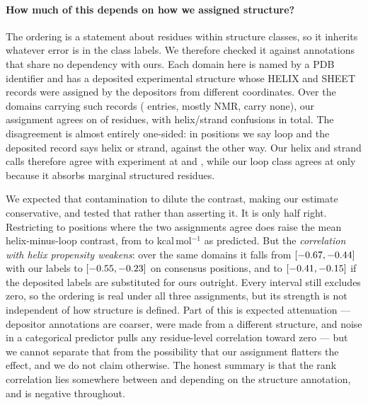 \documentclass[11pt]{article}
\begin{document}
\paragraph{How much of this depends on how we assigned structure?} The ordering is a statement
about residues within structure classes, so it inherits whatever error is in the class labels. We
therefore checked it against annotations that share no dependency with ours. Each domain here is
named by a PDB identifier and has a deposited experimental structure whose HELIX and SHEET records
were assigned by the depositors from different coordinates. Over the \PdbNdom{} domains carrying
such records (\PdbNoRecords{} entries, mostly NMR, carry none), our assignment agrees on
\PdbAgree{} of \PdbNres{} residues, with \PdbHEconf{} helix/strand confusions in total. The
disagreement is almost entirely one-sided: in \PdbWeLoopTheyStruct{} positions we say loop and the
deposited record says helix or strand, against \PdbWeStructTheyLoop{} the other way. Our helix and
strand calls therefore agree with experiment at \PdbRecallH{} and \PdbRecallE{}, while our loop
class agrees at only \PdbRecallL{} because it absorbs marginal structured residues.

We expected that contamination to dilute the contrast, making our estimate conservative, and tested
that rather than asserting it. It is only half right. Restricting to positions where the two
assignments agree does raise the mean helix-minus-loop contrast, from \SensContrastBase{} to
\SensContrastCons{} kcal\,mol$^{-1}$ as predicted. But the \emph{correlation with helix propensity
weakens}: over the same \SensNdom{} domains it falls from \SensBase{}
$[-0.67{}, -0.44{}]$ with our labels to \SensCons{} $[-0.55{}, -0.23{}]$ on
consensus positions, and to \SensDep{} $[-0.41{}, -0.15{}]$ if the deposited labels are
substituted for ours outright. Every interval still excludes zero, so the ordering is real under
all three assignments, but its strength is not independent of how structure is defined. Part of
this is expected attenuation --- depositor annotations are coarser, were made from a different
structure, and noise in a categorical predictor pulls any residue-level correlation toward zero ---
but we cannot separate that from the possibility that our assignment flatters the effect, and we
do not claim otherwise. The honest summary is that the rank correlation lies somewhere between
\SensDep{} and \RhoPace{} depending on the structure annotation, and is negative throughout.
\end{document}

